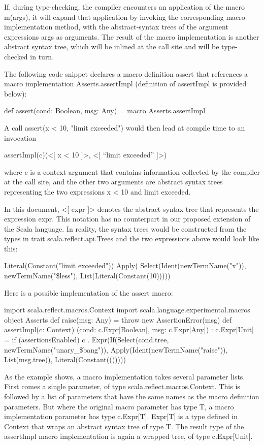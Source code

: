 If, during type-checking, the compiler encounters an application of the macro
m(args), it will expand that application by invoking the corresponding macro
implementation method, with the abstract-syntax trees of the argument
expressions args as arguments. The result of the macro implementation is another
abstract syntax tree, which will be inlined at the call site and will be
type-checked in turn.

The following code snippet declares a macro definition assert that references a
macro implementation Asserts.assertImpl (definition of assertImpl is provided
below):

def assert(cond: Boolean, msg: Any) = macro Asserts.assertImpl

A call assert(x < 10, "limit exceeded") would then lead at compile time to an
invocation

assertImpl(c)(<[ x < 10 ]>, <[ “limit exceeded” ]>)

where c is a context argument that contains information collected by the
compiler at the call site, and the other two arguments are abstract syntax trees
representing the two expressions x < 10 and limit exceeded.

In this document, <[ expr ]> denotes the abstract syntax tree that represents
the expression expr. This notation has no counterpart in our proposed extension
of the Scala language. In reality, the syntax trees would be constructed from
the types in trait scala.reflect.api.Trees and the two expressions above would
look like this:

Literal(Constant("limit exceeded"))
Apply(
  Select(Ident(newTermName("x")), newTermName("\$less"),
  List(Literal(Constant(10)))))
  
Here is a possible implementation of the assert macro:

import scala.reflect.macros.Context
import scala.language.experimental.macros
object Asserts {
  def raise(msg: Any) = throw new AssertionError(msg)
  def assertImpl(c: Context)
    (cond: c.Expr[Boolean], msg: c.Expr[Any]) : c.Expr[Unit] =
   if (assertionsEnabled)
      c . Expr(If(Select(cond.tree, newTermName("unary_\$bang")),
Apply(Ident(newTermName("raise")), List(msg.tree)), Literal(Constant(()))))
}

As the example shows, a macro implementation takes several parameter lists.
First comes a single parameter, of type scala.reflect.macros.Context. This is
followed by a list of parameters that have the same names as the macro
definition parameters. But where the original macro parameter has type T, a
macro implementation parameter has type c.Expr[T]. Expr[T] is a type defined in
Context that wraps an abstract syntax tree of type T. The result type of the
assertImpl macro implementation is again a wrapped tree, of type c.Expr[Unit].


